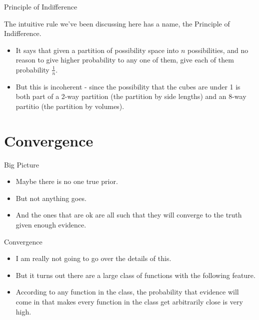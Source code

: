 \documentclass[
  ignorenonframetext,
]{beamer}
\providecommand{\tightlist}{%
  \setlength{\itemsep}{0pt}\setlength{\parskip}{0pt}}
\renewcommand{\,}{\text{, }}
\begin{document}
\begin{frame}{Principle of Indifference}
\protect\hypertarget{principle-of-indifference-1}{}

The intuitive rule we've been discussing here has a name, the Principle
of Indifference.

\begin{itemize}
\tightlist
\item
  It says that given a partition of possibility space into \(n\)
  possibilities, and no reason to give higher probability to any one of
  them, give each of them probability \(\frac{1}{n}\).
\item
  But this is incoherent - since the possibility that the cubes are
  under 1 is both part of a 2-way partition (the partition by side
  lengths) and an 8-way partitio (the partition by volumes).
\end{itemize}

\end{frame}

\hypertarget{convergence-3}{%
\section{Convergence}\label{convergence-3}}

\begin{frame}{Big Picture}
\protect\hypertarget{big-picture-2}{}

\begin{itemize}
\tightlist
\item
  Maybe there is no one true prior.
\item
  But not anything goes.
\item
  And the ones that are ok are all such that they will converge to the
  truth given enough evidence.
\end{itemize}

\end{frame}

\begin{frame}{Convergence}
\protect\hypertarget{convergence-4}{}

\begin{itemize}
\tightlist
\item
  I am really not going to go over the details of this.
\item
  But it turns out there are a large class of functions with the
  following feature.
\item
  According to any function in the class, the probability that evidence
  will come in that makes every function in the class get arbitrarily
  close is very high.
\end{itemize}

\end{frame}
\end{document}
